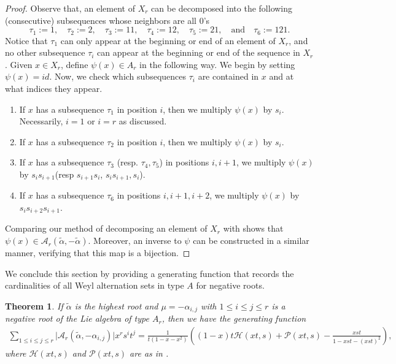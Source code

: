 \documentclass{amsart}
\newtheorem{theorem}{Theorem}[section]
\theoremstyle{definition}
\newcommand{\hroot}{\tilde{\alpha}}
\newcommand{\calP}{\mathcal{P}}
\newcommand{\calH}{\mathcal{H}}
\begin{document}
\begin{proof}
Observe that, an element of $X_r$ can be decomposed into the following (consecutive) subsequences whose neighbors are all 0's  \[
\tau_1:= 1, \quad \tau_2:= 2, \quad
\tau_3:= 11, \quad \tau_4:= 
12,\quad \tau_5:= 21,\quad \mbox{and}\quad\tau_6:= 121.
\]
Notice that $\tau_1$ can only appear at the beginning or end of an element of $X_r$, and no other subsequence $\tau_i$ can appear at the beginning or end of the sequence in $X_r$. Given $x \in X_r$, define $\psi(x) \in A_r$ in the following way. We begin by setting $\psi(x) = id$. Now, we check which subsequences $\tau_i$ are contained in $x$ and at what indices they appear.
\begin{enumerate}
    \item If $x$ has a subsequence $\tau_1$ in position $i$, then  we multiply $\psi(x)$ by $s_i$. Necessarily, $i = 1$ or $i = r$ as discussed.
    \item If $x$ has a subsequence $\tau_2$ in position $i$, then  we multiply $\psi(x)$ by $s_i$.  
    \item If $x$ has a subsequence $\tau_3$ (resp. $\tau_4, \tau_5$) in positions $i,i+1$, we multiply $\psi(x)$ by $s_is_{i+1}$(resp $s_{i+1}s_i$, $s_is_{i+1},s_i$).
    \item If $x$ has a subsequence $\tau_6$ in positions $i,i+1,i+2$, we multiply $\psi(x)$ by $s_is_{i+2}s_{i+1}$.
\end{enumerate}

Comparing our method of decomposing an element of $X_r$ with  shows that $\psi(x) \in \mathcal{A}_r(\hroot,-\hroot)$. Moreover, an inverse to $\psi$ can be constructed in a similar manner, verifying that this map is a bijection. 
\end{proof}

We conclude this section by  providing a generating function that records the cardinalities of all Weyl alternation sets in type $A$ for negative roots. 

\begin{theorem}\label{thm:gen_func} If $\hroot$ is the highest root and $\mu=-\alpha_{i,j}$ with $1\leq i\leq j\leq r$
 is a negative root of the Lie algebra of type $A_r$, then we have the generating function
\begin{align*}
\sum_{1\leq i\leq j\leq r} \vert \mathcal{A}_r(\hroot, -\alpha_{i,j})\vert x^r s^it^j = \frac{1}{t(1-x-x^2)}\left((1-x)t\calH(xt,s)+\calP(xt,s)-\frac{xst}{1-xst-(xst)^2}\right),
\end{align*} where $\calH(xt,s)$ and $\calP(xt,s)$ are as in .
\end{theorem}
\end{document}
